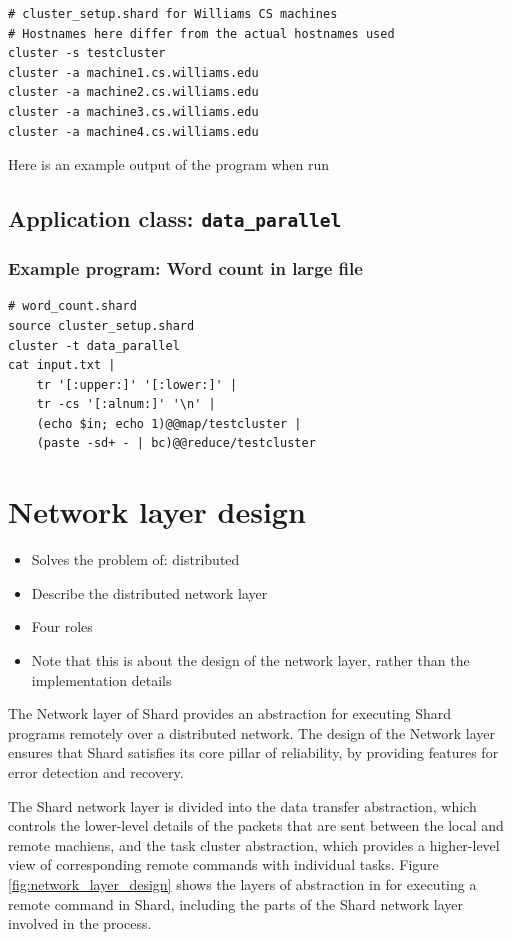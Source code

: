 \documentclass[twoside]{report}
\newcommand{\todoi}[1]{\todo[inline, color=blue!20]{TODO: {#1}}}
\begin{document}
\begin{lstlisting}[language=Shard]
# cluster_setup.shard for Williams CS machines
# Hostnames here differ from the actual hostnames used
cluster -s testcluster
cluster -a machine1.cs.williams.edu
cluster -a machine2.cs.williams.edu
cluster -a machine3.cs.williams.edu
cluster -a machine4.cs.williams.edu
\end{lstlisting}

Here is an example output of the program when run


\subsection{Application class: \texttt{data\_parallel}}

\todoi{Write this subsection}

\subsubsection{Example program: Word count in large file}

\begin{lstlisting}[language=Shard]
# word_count.shard
source cluster_setup.shard
cluster -t data_parallel
cat input.txt |
    tr '[:upper:]' '[:lower:]' |
    tr -cs '[:alnum:]' '\n' |
    (echo $in; echo 1)@@map/testcluster |
    (paste -sd+ - | bc)@@reduce/testcluster
\end{lstlisting}

\section{Network layer design}

\begin{itemize}
  \item Solves the problem of: distributed
  \item Describe the distributed network layer
  \item Four roles
  \item Note that this is about the design of the network layer, rather than the implementation details
\end{itemize}

The Network layer of Shard provides an abstraction for executing Shard programs remotely over a distributed network.
The design of the Network layer ensures that Shard satisfies its core pillar of reliability, by providing features for error detection and recovery.

The Shard network layer is divided into the data transfer abstraction, which controls the lower-level details of the packets that are sent between the local and remote machiens, and the task cluster abstraction, which provides a higher-level view of corresponding remote commands with individual tasks.
Figure \ref{fig:network_layer_design} shows the layers of abstraction in for executing a remote command in Shard, including the parts of the Shard network layer involved in the process.
\end{document}
